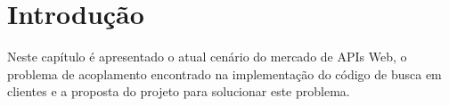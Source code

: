 \chapter{Introdução}

Neste capítulo é apresentado o atual cenário do mercado de APIs Web, o problema de acoplamento encontrado na implementação do código de busca em clientes e a proposta do projeto para solucionar este problema.





